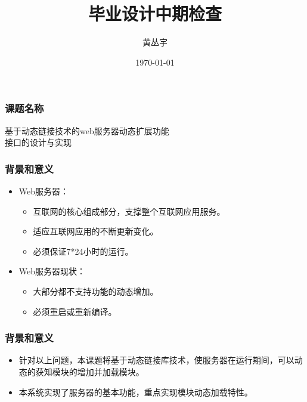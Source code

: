 \documentclass[12pt]{beamer}
\begin{document}
\begin{CJK}{UTF8}{gbsn}	%

\title{毕业设计中期检查}
\author{黄丛宇}
\date{\today}
\frame{\titlepage}

\begin{frame}
	\frametitle{课题名称}
	\begin{center}
	\Large
	{
	基于动态链接技术的web服务器动态扩展功能\\
			接口的设计与实现
	}
	\end{center}
\end{frame}

\begin{frame}
	\frametitle{背景和意义}
	\begin{itemize}
		\item Web服务器：
			\begin{itemize}
				\item 互联网的核心组成部分，支撑整个互联网应用服务。
				\item 适应互联网应用的不断更新变化。
				\item 必须保证7*24小时的运行。
			\end{itemize}
		\pause
		\item Web服务器现状：
			\begin{itemize}
				\item 大部分都不支持功能的动态增加。
				\item 必须重启或重新编译。
			\end{itemize}
	\end{itemize}
\end{frame}

\begin{frame}
	\frametitle{背景和意义}
	\begin{itemize}
		\item 针对以上问题，本课题将基于动态链接库技术，使服务器在运行期间，可以动态的获知模块的增加并加载模块。
		\pause
		\item 本系统实现了服务器的基本功能，重点实现模块动态加载特性。
	\end{itemize}
\end{frame}


\end{CJK}
\end{document}
